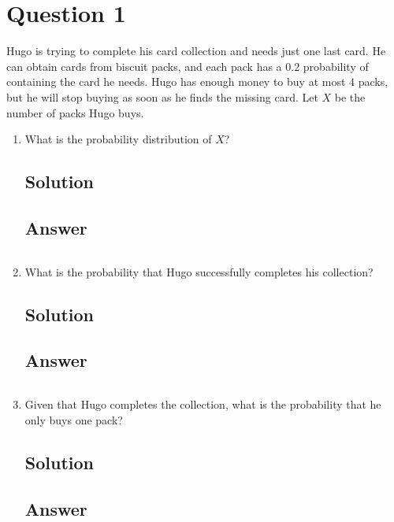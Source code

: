 \documentclass[12pt]{article}
\begin{document}
	
	\section*{Question 1}
	
	\noindent Hugo is trying to complete his card collection and needs just one last card. He can obtain cards from biscuit packs, and each pack has a $0.2$ probability of containing the card he needs. Hugo has enough money to buy at most $4$ packs, but he will stop buying as soon as he finds the missing card. Let $X$ be the number of packs Hugo buys.
	
	\bigskip
	
	\begin{enumerate}[start=1,label={\bfseries Part \arabic*:},leftmargin=0in]
		\bigskip\item What is the probability distribution of $X$?
		
		\subsection*{Solution}
		
		\subsection*{Answer}
		
			\[\boxed{}\]
		
		\bigskip\item What is the probability that Hugo successfully completes his collection?
		
		\subsection*{Solution}
		
		\subsection*{Answer}
		
			\[\boxed{}\]
			
		\bigskip\item Given that Hugo completes the collection, what is the probability that he only buys one pack?
		
		\subsection*{Solution}
		
		\subsection*{Answer}
		
			\[\boxed{}\]
	\end{enumerate}
	
\end{document}
